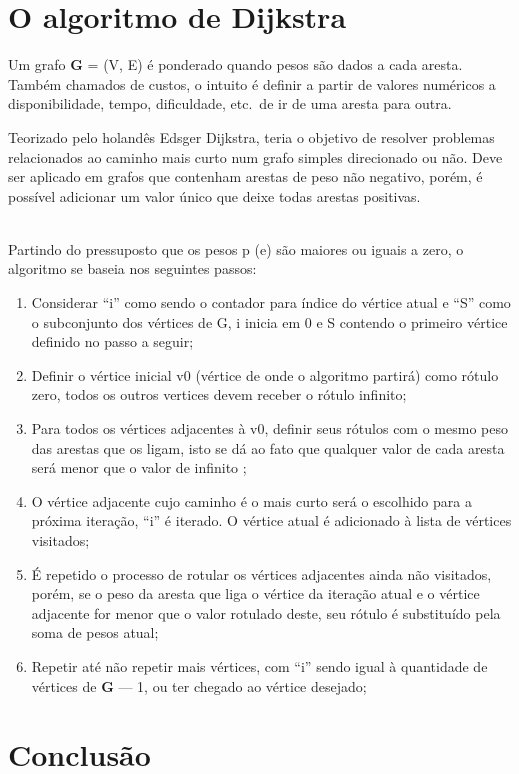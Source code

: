\documentclass[a4paper, 12pt]{article}
\begin{document}
\section{O algoritmo de Dijkstra}
Um grafo \textbf{G} = (V, E) é ponderado quando pesos são dados a cada aresta. Também chamados de custos, o intuito é definir a partir de valores numéricos a disponibilidade, tempo, dificuldade, etc.\ de ir de uma aresta para outra.

Teorizado pelo holandês Edsger Dijkstra, teria o objetivo de resolver problemas relacionados ao caminho mais curto num grafo simples direcionado ou não. Deve ser aplicado em grafos que contenham arestas de peso não negativo, porém, é possível adicionar um valor único que deixe todas arestas positivas.

\\
Partindo do pressuposto que os pesos p (e) são maiores ou iguais a zero, o algoritmo se baseia nos seguintes passos:

\begin{enumerate}
	\item Considerar ``i'' como sendo o contador para índice do vértice atual e ``S'' como o subconjunto dos vértices de G, i inicia em 0 e S contendo o primeiro vértice definido no passo a seguir;
	\item Definir o vértice inicial v0 (vértice de onde o algoritmo partirá) como rótulo zero, todos os outros vertices devem receber o rótulo infinito;
	\item Para todos os vértices adjacentes à v0, definir seus rótulos com o mesmo peso das arestas que os ligam, isto se dá ao fato que qualquer valor de cada aresta será menor que o valor de infinito {\infty};

	\item O vértice adjacente cujo caminho é o mais curto será o escolhido para a próxima iteração, ``i'' é iterado. O vértice atual é adicionado à lista de vértices visitados;
	\item É repetido o processo de rotular os vértices adjacentes ainda não visitados, porém, se o peso da aresta que liga o vértice da iteração atual e o vértice adjacente for menor que o valor rotulado deste, seu rótulo é substituído pela soma de pesos atual;
	\item Repetir até não repetir mais vértices, com ``i'' sendo igual à quantidade de vértices de \textbf{G} --- 1, ou ter chegado ao vértice desejado;

\end{enumerate}
\section{Conclusão}
\end{document}
